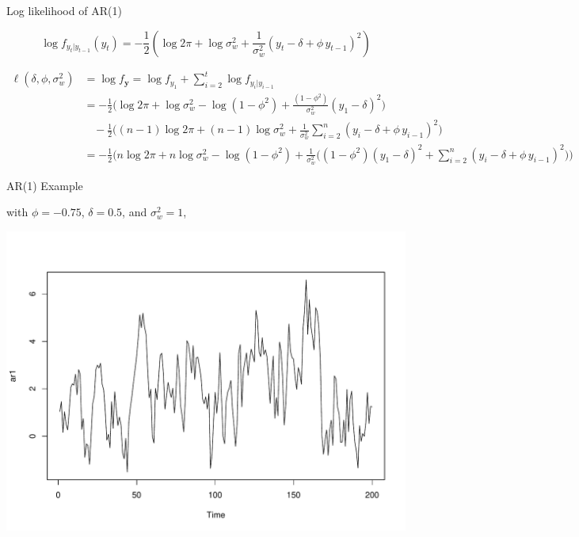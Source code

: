 \documentclass[11pt,ignorenonframetext,]{beamer}
\begin{document}
\begin{frame}[t]{Log likelihood of AR(1)}

\scriptsize
\[
\log f_{y_{t} | y_{t-1}}(y_t) = -\frac{1}{2}\left( \log 2\pi + \log \sigma^2_w + \frac{1}{\sigma_w^2} (y_t -\delta+\phi\, y_{t-1})^2 \right)
\]

\[
\begin{aligned}
\ell(\delta, \phi, \sigma^2_w) 
  &= \log f_{\bm{y}} = \log f_{y_1} + \sum_{i=2}^t \log f_{y_{i}|y_{i-1}} \\
  &= - \frac{1}{2} \bigg(\log 2\pi + \log \sigma_w^2 - \log (1-\phi^2) + \frac{(1-\phi^2)}{\sigma_w^2 }(y_1-\delta)^2 \bigg) \\
  & ~~~~ - \frac{1}{2} \bigg( (n-1) \log 2\pi + (n-1) \log \sigma_w^2 + \frac{1}{\sigma_w^2} \sum_{i=2}^n (y_i -\delta+\phi\, y_{i-1})^2 \bigg) \\
  &= - \frac{1}{2} \bigg( n \log 2\pi + n \log \sigma_w^2 - \log (1-\phi^2) + \frac{1}{\sigma_w^2} \bigg( (1-\phi^2)(y_1-\delta)^2 + \sum_{i=2}^n (y_i -\delta+\phi\, y_{i-1})^2 \bigg) \bigg)
\end{aligned}
\]

\end{frame}

\begin{frame}[t]{AR(1) Example}

with \(\phi = -0.75\), \(\delta=0.5\), and \(\sigma_w^2=1\),

\includegraphics{Lec10_files/figure-beamer/unnamed-chunk-1-1.pdf}

\end{frame}
\end{document}
